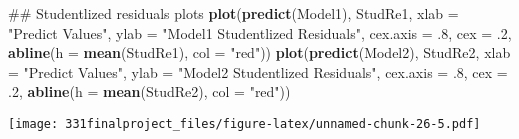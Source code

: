 \documentclass[]{article}
\newenvironment{Shaded}{\begin{snugshade}}{\end{snugshade}}
\newcommand{\KeywordTok}[1]{\textcolor[rgb]{0.13,0.29,0.53}{\textbf{#1}}}
\newcommand{\DataTypeTok}[1]{\textcolor[rgb]{0.13,0.29,0.53}{#1}}
\newcommand{\DecValTok}[1]{\textcolor[rgb]{0.00,0.00,0.81}{#1}}
\newcommand{\StringTok}[1]{\textcolor[rgb]{0.31,0.60,0.02}{#1}}
\newcommand{\NormalTok}[1]{#1}
\begin{document}
\begin{Shaded}
\begin{Highlighting}[]
\NormalTok{## Studentlized residuals plots}
\KeywordTok{plot}\NormalTok{(}\KeywordTok{predict}\NormalTok{(Model1), StudRe1, }\DataTypeTok{xlab =} \StringTok{"Predict Values"}\NormalTok{, }\DataTypeTok{ylab =} \StringTok{"Model1 Studentlized Residuals"}\NormalTok{, }\DataTypeTok{cex.axis =}\NormalTok{ .}\DecValTok{8}\NormalTok{,}
     \DataTypeTok{cex =}\NormalTok{ .}\DecValTok{2}\NormalTok{, }\KeywordTok{abline}\NormalTok{(}\DataTypeTok{h =} \KeywordTok{mean}\NormalTok{(StudRe1), }\DataTypeTok{col =} \StringTok{"red"}\NormalTok{))}
\KeywordTok{plot}\NormalTok{(}\KeywordTok{predict}\NormalTok{(Model2), StudRe2, }\DataTypeTok{xlab =} \StringTok{"Predict Values"}\NormalTok{, }\DataTypeTok{ylab =} \StringTok{"Model2 Studentlized Residuals"}\NormalTok{, }\DataTypeTok{cex.axis =}\NormalTok{ .}\DecValTok{8}\NormalTok{,}
     \DataTypeTok{cex =}\NormalTok{ .}\DecValTok{2}\NormalTok{, }\KeywordTok{abline}\NormalTok{(}\DataTypeTok{h =} \KeywordTok{mean}\NormalTok{(StudRe2), }\DataTypeTok{col =} \StringTok{"red"}\NormalTok{))}
\end{Highlighting}
\end{Shaded}

\texttt{[image: 331finalproject\_files/figure-latex/unnamed-chunk-26-5.pdf]}
\end{document}
